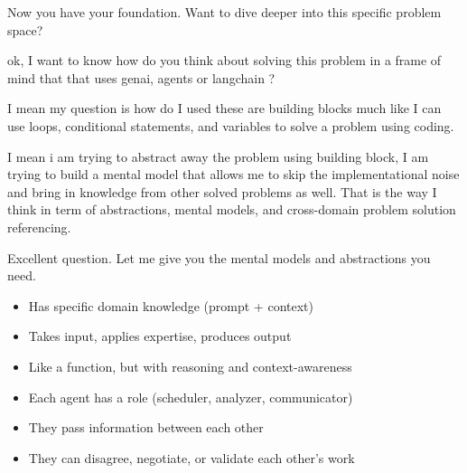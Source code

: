 Now you have your foundation. Want to dive deeper into this specific problem space?


ok, I want to know how do you think about solving this problem in a frame of mind that that uses genai, agents or langchain ?

I mean my question is how do I used these are building blocks much like I can use loops, conditional statements, and variables to solve a problem using coding.

I mean i am trying to abstract away the problem using building block, I am trying to build a mental model that allows me to skip the implementational noise and bring in knowledge from other solved problems as well. That is the way I think in term of abstractions, mental models, and cross-domain problem solution referencing.


Excellent question. Let me give you the mental models and abstractions you need.



\begin{itemize}
\item Has specific domain knowledge (prompt + context)
\end{itemize}
\begin{itemize}
\item Takes input, applies expertise, produces output
\end{itemize}
\begin{itemize}
\item Like a function, but with reasoning and context-awareness
\end{itemize}


\begin{itemize}
\item Each agent has a role (scheduler, analyzer, communicator)
\end{itemize}
\begin{itemize}
\item They pass information between each other
\end{itemize}
\begin{itemize}
\item They can disagree, negotiate, or validate each other's work
\end{itemize}

